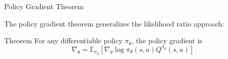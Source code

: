 \begin{frame}[c]{Policy Gradient Theorem}
	
The policy gradient theorem generalizes the likelihood ratio approach:
\begin{block}{Theorem}
For any differentiable policy $\pi_\theta$, the policy gradient is
$$\nabla_\theta= \mathbb{E}_{\pi_\theta} [\nabla_\theta \log \pi_\theta(s,a) Q^{\pi_\theta}(s,a)] $$

\end{block}
	
\end{frame}

